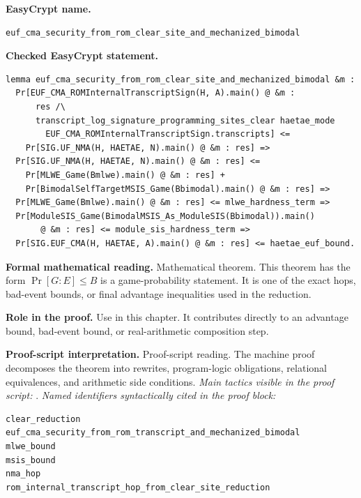\begin{formaltheorem}
\noindent\textbf{EasyCrypt name.}
\begin{lstlisting}[language=EasyCrypt,basicstyle=\ttfamily\scriptsize]
euf_cma_security_from_rom_clear_site_and_mechanized_bimodal
\end{lstlisting}
\noindent\textbf{Checked EasyCrypt statement.}
\begin{lstlisting}[language=EasyCrypt,basicstyle=\ttfamily\scriptsize]
lemma euf_cma_security_from_rom_clear_site_and_mechanized_bimodal &m :
  Pr[EUF_CMA_ROMInternalTranscriptSign(H, A).main() @ &m :
      res /\
      transcript_log_signature_programming_sites_clear haetae_mode
        EUF_CMA_ROMInternalTranscriptSign.transcripts] <=
    Pr[SIG.UF_NMA(H, HAETAE, N).main() @ &m : res] =>
  Pr[SIG.UF_NMA(H, HAETAE, N).main() @ &m : res] <=
    Pr[MLWE_Game(Bmlwe).main() @ &m : res] +
    Pr[BimodalSelfTargetMSIS_Game(Bbimodal).main() @ &m : res] =>
  Pr[MLWE_Game(Bmlwe).main() @ &m : res] <= mlwe_hardness_term =>
  Pr[ModuleSIS_Game(BimodalMSIS_As_ModuleSIS(Bbimodal)).main()
       @ &m : res] <= module_sis_hardness_term =>
  Pr[SIG.EUF_CMA(H, HAETAE, A).main() @ &m : res] <= haetae_euf_bound.
\end{lstlisting}
\noindent\textbf{Formal mathematical reading.}
Mathematical theorem. This theorem has the form \(\Pr[G:E] \le B\) is a game-probability statement.  It is one of the exact hops, bad-event bounds, or final advantage inequalities used in the reduction.

\noindent\textbf{Role in the proof.}
Use in this chapter. It contributes directly to an advantage bound, bad-event bound, or real-arithmetic composition step.

\noindent\textbf{Proof-script interpretation.}
Proof-script reading. The machine proof decomposes the theorem into rewrites, program-logic obligations, relational equivalences, and arithmetic side conditions.
\emph{Main tactics visible in the proof script:} \ec{apply}.
\emph{Named identifiers syntactically cited in the proof block:}
\begin{lstlisting}[language=EasyCrypt,basicstyle=\ttfamily\scriptsize]
clear_reduction
euf_cma_security_from_rom_transcript_and_mechanized_bimodal
mlwe_bound
msis_bound
nma_hop
rom_internal_transcript_hop_from_clear_site_reduction
\end{lstlisting}

\end{formaltheorem}

